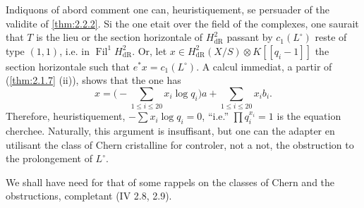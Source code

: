\documentclass[12pt,a4paper]{article}
\theoremstyle{plain}
\theoremstyle{definition}
\theoremstyle{remark}
\DeclareMathOperator{\Fil}{Fil}
\begin{document}
\subsubsection{}
Indiquons of abord comment one can, heuristiquement, se persuader of the validite of \ref{thm:2.2.2}. Si the one etait over the field of the complexes, one saurait that $T$ is the lieu or the section horizontale of $H^2_\mathrm{dR}$ passant by $c_1(L^\circ)$ reste of type $(1,1)$, i.e. in $\Fil^1 H^2_\mathrm{dR}$. Or, let $x \in H^2_\mathrm{dR}(X/S) \otimes K[[q_i - 1]]$ the section horizontale such that $e^*x = c_1(L^\circ)$. A calcul immediat, a partir of (\ref{thm:2.1.7} (ii)), shows that the one has
\begin{equation}\tag{2.2.3.1}
x = \bigl(-\sum_{1\leqslant i\leqslant 20} x_i \log q_i\bigr)a + \sum_{1\leqslant i\leqslant 20} x_i b_i. 
\end{equation}
Therefore, heuristiquement, $-\sum x_i \log q_i = 0$, ``i.e.'' $\prod q_i^{x_i} = 1$ is the equation cherchee. Naturally, this argument is insuffisant, but one can the adapter en utilisant the class of Chern cristalline for controler, not a not, the obstruction to the prolongement of $L^\circ$.

We shall have need for that of some rappels on the classes of Chern and the obstructions, completant (IV 2.8, 2.9).
\end{document}
